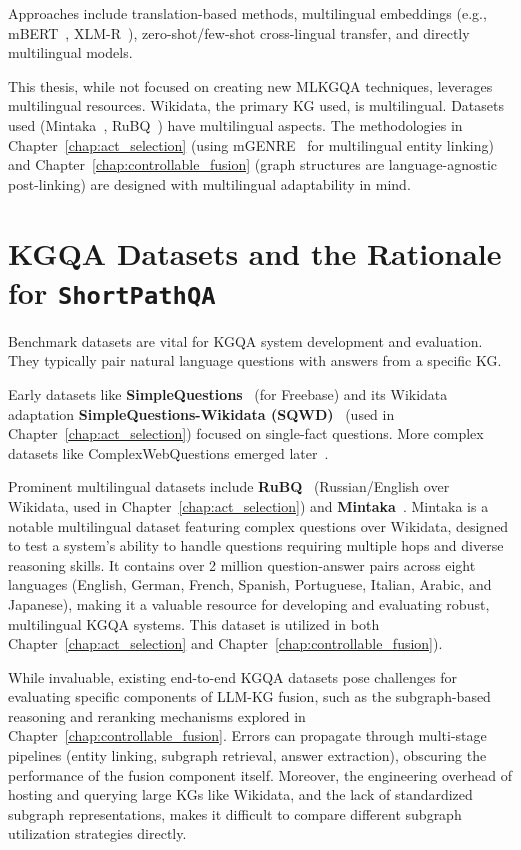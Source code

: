 Approaches include translation-based methods, multilingual embeddings (e.g., mBERT~\cite{DBLP:conf/naacl/DevlinCLT19}, XLM-R~\cite{DBLP:conf/acl/ConneauKGCWGGOZ20}), zero-shot/few-shot cross-lingual transfer, and directly multilingual models.

This thesis, while not focused on creating new MLKGQA techniques, leverages multilingual resources. Wikidata, the primary KG used, is multilingual. Datasets used (Mintaka~\cite{DBLP:conf/coling/SenAS22-mintaka}, RuBQ~\cite{korablinov2020rubq}) have multilingual aspects. The methodologies in Chapter~\ref{chap:act_selection} (using mGENRE~\cite{decao2021multilingual} for multilingual entity linking) and Chapter~\ref{chap:controllable_fusion} (graph structures are language-agnostic post-linking) are designed with multilingual adaptability in mind.

\section{KGQA Datasets and the Rationale for \texttt{ShortPathQA}}
\label{sec:rw_datasets_shortpathqa}
Benchmark datasets are vital for KGQA system development and evaluation. They typically pair natural language questions with answers from a specific KG.

Early datasets like \textbf{SimpleQuestions}~\cite{simplequestions} (for Freebase) and its Wikidata adaptation \textbf{SimpleQuestions-Wikidata (SQWD)}~\cite{SQ_WD} (used in Chapter~\ref{chap:act_selection}) focused on single-fact questions. More complex datasets like ComplexWebQuestions emerged later~\cite{DBLP:conf/naacl/TalmorB18}.

Prominent multilingual datasets include \textbf{RuBQ}~\cite{korablinov2020rubq,rybin2021rubq} (Russian/English over Wikidata, used in Chapter~\ref{chap:act_selection}) and \textbf{Mintaka}~\cite{DBLP:conf/coling/SenAS22-mintaka}. Mintaka is a notable multilingual dataset featuring complex questions over Wikidata, designed to test a system's ability to handle questions requiring multiple hops and diverse reasoning skills. It contains over 2 million question-answer pairs across eight languages (English, German, French, Spanish, Portuguese, Italian, Arabic, and Japanese), making it a valuable resource for developing and evaluating robust, multilingual KGQA systems. This dataset is utilized in both Chapter~\ref{chap:act_selection} and Chapter~\ref{chap:controllable_fusion}).

While invaluable, existing end-to-end KGQA datasets pose challenges for evaluating specific components of LLM-KG fusion, such as the subgraph-based reasoning and reranking mechanisms explored in Chapter~\ref{chap:controllable_fusion}. Errors can propagate through multi-stage pipelines (entity linking, subgraph retrieval, answer extraction), obscuring the performance of the fusion component itself. Moreover, the engineering overhead of hosting and querying large KGs like Wikidata, and the lack of standardized subgraph representations, makes it difficult to compare different subgraph utilization strategies directly.

